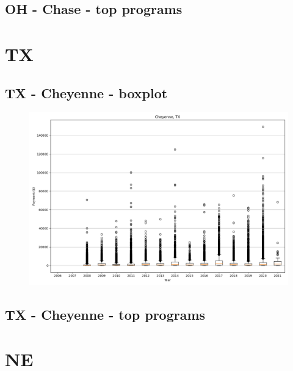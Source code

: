 \subsection*{OH - Chase - top programs}

\newpage
\section*{TX}
\subsection*{TX - Cheyenne - boxplot}
\begin{figure}[h]
\centering
\includegraphics[width=7in]{../output/boxplots/counties/Cheyenne-TX_boxplot.png}
\end{figure}


\subsection*{TX - Cheyenne - top programs}

\newpage
\section*{NE}
